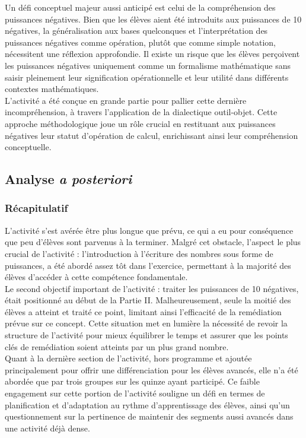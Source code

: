 Un défi conceptuel majeur aussi anticipé est celui de la compréhension des puissances négatives.
Bien que les élèves aient été introduits aux puissances de 10 négatives,
la généralisation aux bases quelconques et l'interprétation des puissances négatives comme opération,
plutôt que comme simple notation,
nécessitent une réflexion approfondie.
Il existe un risque que les élèves perçoivent les puissances négatives uniquement comme un formalisme mathématique sans saisir pleinement leur signification opérationnelle et leur utilité dans différents contextes mathématiques.\\

L'activité a été conçue en grande partie pour pallier cette dernière incompréhension,
à travers l'application de la dialectique outil-objet.
Cette approche méthodologique joue un rôle crucial en restituant aux puissances négatives leur statut d'opération de calcul,
enrichissant ainsi leur compréhension conceptuelle.

\subsection{Analyse \textit{a posteriori}}
\subsubsection{Récapitulatif}
L'activité s'est avérée être plus longue que prévu,
ce qui a eu pour conséquence que peu d'élèves sont parvenus à la terminer.
Malgré cet obstacle,
l'aspect le plus crucial de l'activité :
l'introduction à l'écriture des nombres sous forme de puissances,
a été abordé assez tôt dans l'exercice,
permettant à la majorité des élèves d'accéder à cette compétence fondamentale.\\

Le second objectif important de l'activité :
traiter les puissances de 10 négatives,
était positionné au début de la Partie II.
Malheureusement,
seule la moitié des élèves a atteint et traité ce point,
limitant ainsi l'efficacité de la remédiation prévue sur ce concept.
Cette situation met en lumière la nécessité de revoir la structure de l'activité pour mieux équilibrer le temps et assurer que les points clés de remédiation soient atteints par un plus grand nombre.\\

Quant à la dernière section de l'activité,
hors programme et ajoutée principalement pour offrir une différenciation pour les élèves avancés,
elle n'a été abordée que par trois groupes sur les quinze ayant participé.
Ce faible engagement sur cette portion de l'activité souligne un défi en termes de planification et d'adaptation au rythme d'apprentissage des élèves,
ainsi qu'un questionnement sur la pertinence de maintenir des segments aussi avancés dans une activité déjà dense.

